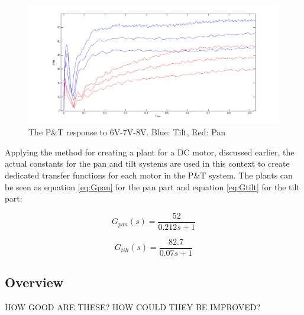\begin{figure}[h!]
\centering
\includegraphics[scale=0.35]{Billeder/PTStepResponseGraph.png}
\caption{The P\&T response to 6V-7V-8V. Blue: Tilt, Red: Pan}
\label{fig:PTStepResponseGraph}
\end{figure}

Applying the method for creating a plant for a DC motor, discussed earlier, the actual constants for the pan and tilt systems are used in this context to create dedicated transfer functions for each motor in the P\&T system. The plants can be seen as equation \ref{eq:Gpan} for the pan part and equation \ref{eq:Gtilt} for the tilt part:

\begin{equation}
G_{pan} (s) = \frac{52}{0.212s+1}
\label{eq:Gpan}
\end{equation}

\begin{equation}
G_{tilt} (s) = \frac{82.7}{0.07s+1}
\label{eq:Gtilt}
\end{equation}

\subsection{Overview}
HOW GOOD ARE THESE?
HOW COULD THEY BE IMPROVED?
